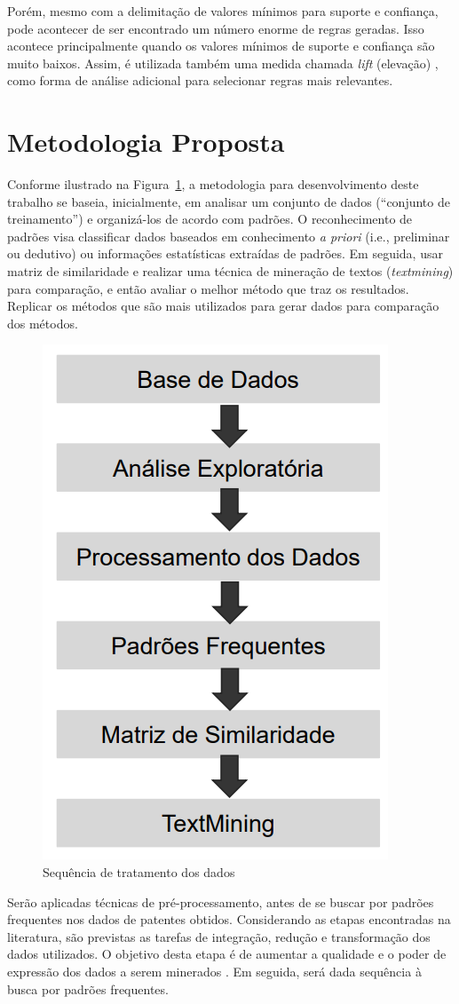 \documentclass[12pt]{article}
\begin{document}
Porém, mesmo com a delimitação de valores mínimos para suporte e confiança, pode acontecer de ser encontrado um número enorme de regras geradas. Isso acontece principalmente quando os valores mínimos de suporte e confiança são muito baixos. Assim, é utilizada também uma medida chamada \textit{lift}  (elevação) \citep{webb2000efficient}, como forma de análise adicional para selecionar regras mais relevantes.


\section{Metodologia Proposta}
\label{sec:met}

Conforme ilustrado na Figura~\ref{fig:tratamento}, a metodologia para desenvolvimento deste trabalho se baseia, inicialmente, em analisar um conjunto de dados (``conjunto de treinamento'') e organizá-los de acordo com padrões. O reconhecimento de padrões visa classificar dados baseados em conhecimento\textit{ a priori} (i.e., preliminar ou dedutivo) ou informações estatísticas extraídas de padrões. 
Em seguida, usar matriz de similaridade e realizar uma técnica de mineração de textos (\textit{textmining}) para comparação, e então avaliar o melhor método que traz os resultados.
Replicar os métodos que são mais utilizados para gerar dados para comparação dos métodos.

\begin{figure}[!h]
\centering
\includegraphics[width=.4\textwidth]{Metodologia_.png}
\caption{Sequência de tratamento dos dados}
\label{fig:tratamento}
\end{figure}


Serão aplicadas técnicas de pré-processamento, antes de se buscar por padrões frequentes nos dados de patentes obtidos. Considerando as etapas encontradas na literatura, são previstas as tarefas de integração, redução e transformação dos dados utilizados. O objetivo desta etapa é de aumentar a qualidade e o poder de expressão dos dados a serem minerados \citep{han2011data}. Em seguida, será dada sequência à busca por padrões frequentes.
\end{document}
